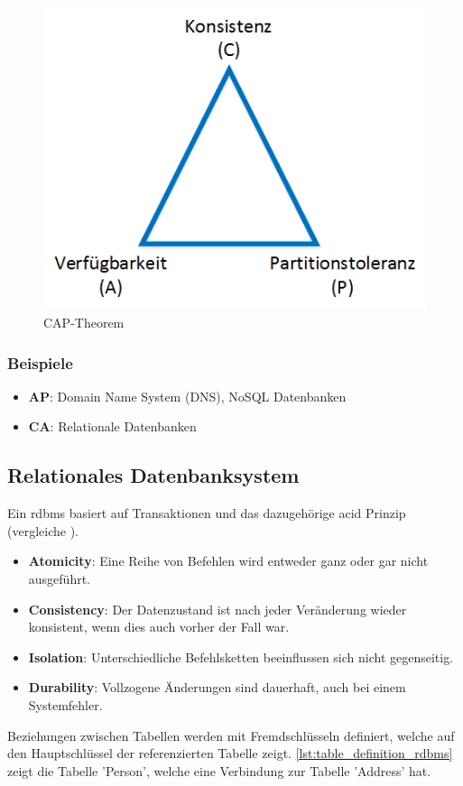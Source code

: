 \begin{figure}[h]
\centering
\includegraphics[scale=0.8]{images/visio/cap.png}
\caption[CAP-Theorem]{CAP-Theorem \selfmade{}}
\label{fig:cap}
\end{figure}

\subsubsection{Beispiele}

\begin{itemize}
	\item \textbf{AP}: Domain Name System (DNS), NoSQL Datenbanken
	\item \textbf{CA}: Relationale Datenbanken
\end{itemize}

\subsection{Relationales Datenbanksystem}\label{rdbms}
Ein \gls{rdbms} basiert auf Transaktionen und das dazugehörige \gls{acid} Prinzip (vergleiche \cite{limited2010introduction}). 
\begin{itemize}
	\item \textbf{Atomicity}: Eine Reihe von Befehlen wird entweder ganz oder gar nicht ausgeführt.
	\item \textbf{Consistency}: Der Datenzustand ist nach jeder Veränderung wieder konsistent, wenn dies auch vorher der Fall war.
	\item \textbf{Isolation}: Unterschiedliche Befehlsketten beeinflussen sich nicht gegenseitig.
	\item \textbf{Durability}: Vollzogene Änderungen sind dauerhaft, auch bei einem Systemfehler.
\end{itemize}
Beziehungen zwischen Tabellen werden mit Fremdschlüsseln definiert, welche auf den Hauptschlüssel der referenzierten Tabelle zeigt. \autoref{lst:table_definition_rdbms} zeigt die
Tabelle 'Person', welche eine Verbindung zur Tabelle 'Address' hat.

